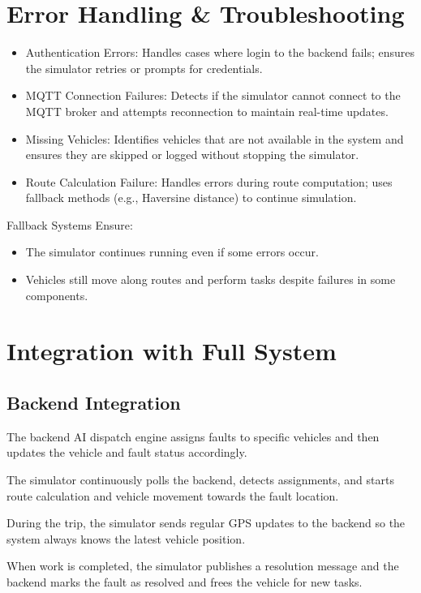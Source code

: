 \section{Error Handling \& Troubleshooting}
\begin{itemize}
    \item Authentication Errors: Handles cases where login to the backend fails; ensures the simulator retries or prompts for credentials.
    \item MQTT Connection Failures: Detects if the simulator cannot connect to the MQTT broker and attempts reconnection to maintain real-time updates.
    \item Missing Vehicles: Identifies vehicles that are not available in the system and ensures they are skipped or logged without stopping the simulator.
    \item Route Calculation Failure: Handles errors during route computation; uses fallback methods (e.g., Haversine distance) to continue simulation.
\end{itemize}

Fallback Systems Ensure:
\begin{itemize}
    \item The simulator continues running even if some errors occur.
    \item Vehicles still move along routes and perform tasks despite failures in some components.
\end{itemize}

\section{Integration with Full System}

\subsection{Backend Integration}
The backend AI dispatch engine assigns faults to specific vehicles and then updates the vehicle and fault status accordingly.

The simulator continuously polls the backend, detects assignments, and starts route calculation and vehicle movement towards the fault location.

During the trip, the simulator sends regular GPS updates to the backend so the system always knows the latest vehicle position.

When work is completed, the simulator publishes a resolution message and the backend marks the fault as resolved and frees the vehicle for new tasks.

